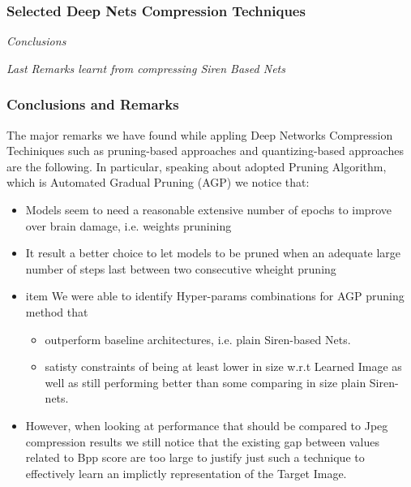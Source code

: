 



\begin{frame}
    \frametitle{Selected Deep Nets Compression Techniques}
        \begin{center}
            {\fontsize{40}{50}\selectfont \emph{Conclusions}}
        \end{center}
        \begin{center}
            \emph{Last Remarks learnt from compressing Siren Based Nets}
        \end{center}
\end{frame}


\begin{frame}
    \frametitle{Conclusions and Remarks}
    The major remarks we have found while appling Deep Networks Compression Techiniques such as pruning-based approaches and quantizing-based approaches
    are the following. In particular, speaking about adopted Pruning Algorithm, which is Automated Gradual Pruning (AGP) we notice that:
    \begin{itemize}
        \item Models seem to need a reasonable extensive number of epochs to improve over brain damage, i.e. weights prunining
        \item It result a better choice to let models to be pruned when an adequate large number of steps last between two consecutive wheight pruning
        \item item We were able to identify Hyper-params combinations for AGP pruning method that
        \begin{itemize}
            \item outperform baseline architectures, i.e. plain Siren-based Nets.
            \item satisty constraints of being at least lower in size w.r.t Learned
            Image as well as still performing better than some comparing in size plain Siren-nets.
        \end{itemize}
        \item However, when looking at performance that should be compared to Jpeg compression results we still notice that the existing gap
        between values related to Bpp score are too large to justify just such a technique to effectively learn an implictly representation of the Target Image.
    \end{itemize}
\end{frame}


